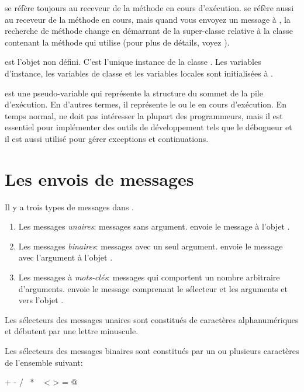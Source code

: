 \documentclass[a4paper,10pt,twoside]{book}
\begin{document}
 se réfère toujours au receveur de la méthode en cours d'exécution.
 se réfère aussi au receveur de la méthode en
cours, mais quand vous envoyez un message à \super, la recherche
de méthode change en démarrant de la super-classe relative à la classe contenant la méthode qui utilise 
(pour plus de détails, voyez ).

 est l'objet non défini.
C'est l'unique instance de la classe . 
Les variables d'instance, les variables de classe et les variables locales  sont initialisées à .

 est une pseudo-variable qui représente la structure du sommet de la pile d'exécution.
En d'autres termes, il représente le  ou le  en cours d'exécution.
En temps normal,  ne doit pas intéresser la plupart
des programmeurs, mais il est essentiel pour implémenter des
outils de développement tels que le débogueur et il est aussi utilisé pour gérer exceptions et continuations.

\section{Les envois de messages}

Il y a trois types de messages dans \pharo.
\begin{enumerate}
  \item Les messages \emph{unaires}: messages sans argument.
   envoie le message   à l'objet .
  \item Les messages \emph{binaires}: messages avec un seul argument.
  	 envoie le message \ct{+} avec l'argument  à l'objet .
  \item Les messages à \emph{mots-clés}: messages qui comportent un nombre arbitraire d'arguments.
  	 envoie le message comprenant le sélecteur  et les arguments  et  vers l'objet .
\end{enumerate}

Les sélecteurs des messages unaires sont constitués de caractères alphanumériques et débutent par une lettre minuscule. 

Les sélecteurs des messages binaires sont constitués par un ou plusieurs caractères de l'ensemble suivant:
\begin{code}{}
+ - / \ * ~ < > = @ %
\end{code}
\noindent
\end{document}
